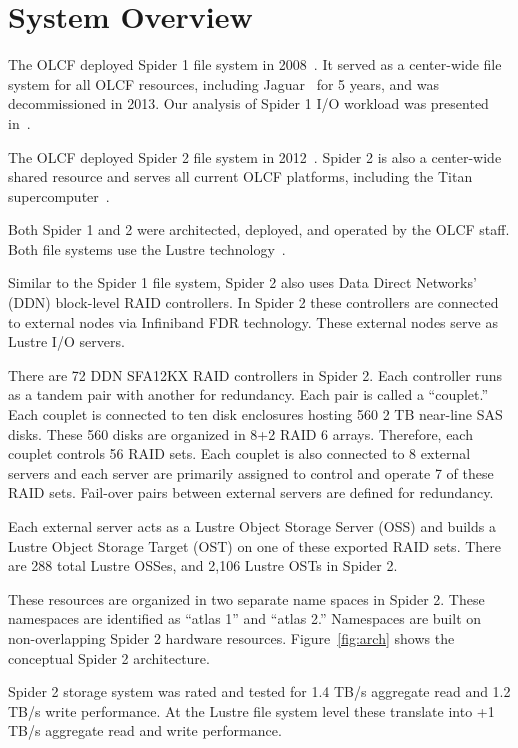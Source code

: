 \section{System Overview}
\label{sec:overview}

The OLCF deployed Spider 1 file system in 2008~\cite{spider1}. It served as a
center-wide file system for all OLCF resources, including Jaguar~\cite{jaguar}
for 5 years, and was decommissioned in 2013. Our analysis of Spider 1 I/O
workload was presented in~\cite{spider1-workload}. 

The OLCF deployed Spider 2 file system in 2012~\cite{spider2}. Spider 2 is also
a center-wide shared resource and serves all current OLCF platforms, including
the Titan supercomputer~\cite{titan}.

Both Spider 1 and 2 were architected, deployed, and operated by the OLCF staff.
Both file systems use the Lustre technology~\cite{Lustre}.

Similar to the Spider 1 file system, Spider 2 also uses Data Direct Networks'
(DDN) block-level RAID controllers. In Spider 2 these controllers are connected
to external nodes via Infiniband FDR technology. These external nodes serve as
Lustre I/O servers.

There are 72 DDN  SFA12KX RAID controllers in Spider 2. Each controller runs as
a tandem pair with another for redundancy. Each pair is called a ``couplet.''
Each couplet is connected to ten disk enclosures hosting 560 2 TB near-line SAS
disks. These 560 disks are organized in 8+2 RAID 6 arrays. Therefore, each
couplet controls 56 RAID sets. Each couplet is also connected to 8 external
servers and each server are primarily assigned to control and operate 7 of
these RAID sets. Fail-over pairs between external servers are defined for
redundancy.

Each external server acts as a Lustre Object Storage Server (OSS) and builds a
Lustre Object Storage Target (OST) on one of these exported RAID sets. There
are 288 total Lustre OSSes, and 2,106 Lustre OSTs in Spider 2.

These resources are organized in two separate name spaces in Spider 2. These
namespaces are identified as ``atlas 1'' and ``atlas 2.'' Namespaces are built
on non-overlapping Spider 2 hardware resources. Figure~\ref{fig:arch} shows the
conceptual Spider 2 architecture. 

Spider 2 storage system was rated and tested for 1.4 TB/s aggregate read and
1.2 TB/s write performance. At the Lustre file system level these translate
into +1 TB/s aggregate read and write performance.

